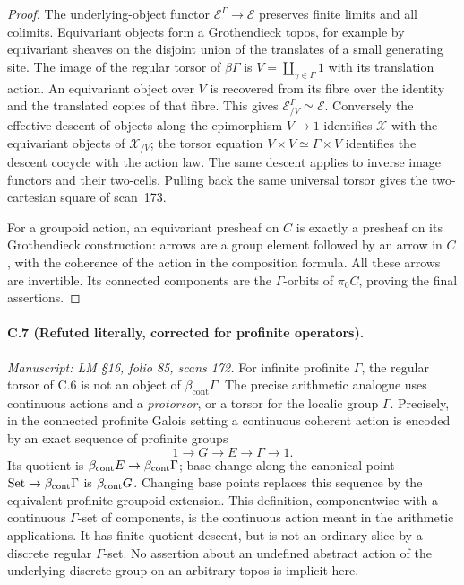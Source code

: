 \begin{proof}
The underlying-object functor
$\mathcal E^\Gamma\to\mathcal E$ preserves finite
limits and all colimits. Equivariant objects
form a Grothendieck topos, for example by
equivariant sheaves on the disjoint union
of the translates of a small generating
site. The image of the regular torsor of
$\beta\Gamma$ is $V=\coprod_{\gamma\in\Gamma}1$
with its translation action. An equivariant
object over $V$ is recovered from its fibre
over the identity and the translated copies
of that fibre. This gives
$\mathcal E^\Gamma_{/V}\simeq\mathcal E$.
Conversely the effective descent of objects
along the epimorphism $V\to1$ identifies
$\mathcal X$ with the equivariant objects
of $\mathcal X_{/V}$; the torsor equation
$V\times V\simeq\Gamma\times V$ identifies
the descent cocycle with the action law.
The same descent applies to inverse image
functors and their two-cells. Pulling back
the same universal torsor gives the
two-cartesian square of scan~173.

For a groupoid action, an equivariant
presheaf on $C$ is exactly a presheaf on
its Grothendieck construction: arrows are
a group element followed by an arrow in
$C$, with the coherence of the action in
the composition formula. All these arrows
are invertible. Its connected components
are the $\Gamma$-orbits of $\pi_0C$,
proving the final assertions.
\end{proof}

\paragraph{C.7 (Refuted literally, corrected for profinite operators).}\label{C7}
\textit{Manuscript: LM \S16, folio 85, scans 172.}
For infinite profinite $\Gamma$, the regular torsor
of C.6 is not an object of
$\beta_{\mathrm{cont}}\Gamma$. The precise arithmetic
analogue uses continuous actions and a
\emph{protorsor}, or a torsor for the localic
group $\Gamma$. Precisely, in the connected profinite
Galois setting a continuous coherent action is encoded by
an exact sequence of profinite groups
\[
 1\longrightarrow G\longrightarrow E\longrightarrow\Gamma
 \longrightarrow1.
\]
Its quotient is $\beta_{\rm cont}E\to\beta_{\rm cont}\Gamma$;
base change along the canonical point
$\mathrm{Set}\to\beta_{\rm cont}\Gamma$ is $\beta_{\rm cont}G$.
Changing base points replaces this sequence by the
equivalent profinite groupoid extension. This definition,
componentwise with a continuous $\Gamma$-set of components,
is the continuous action meant in the arithmetic applications.
It has finite-quotient descent, but is not an ordinary slice
by a discrete regular $\Gamma$-set. No assertion about an
undefined abstract action of the underlying discrete group
on an arbitrary topos is implicit here.

